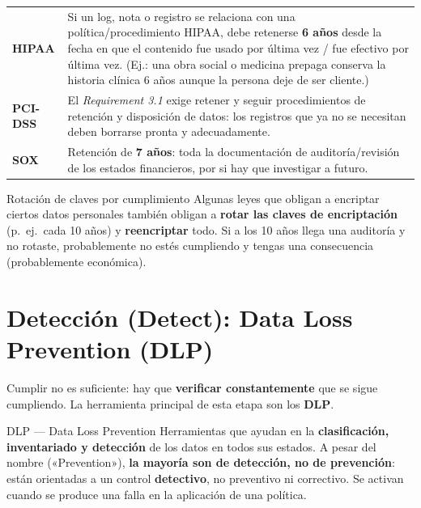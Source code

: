 \documentclass[11pt,a4paper]{article}
\begin{document}
\begin{center}
\renewcommand{\arraystretch}{1.3}
\begin{tabular}{>{\bfseries}p{2.6cm} p{11.6cm}}
\toprule
HIPAA & Si un log, nota o registro se relaciona con una política/procedimiento HIPAA, debe
retenerse \textbf{6 años} desde la fecha en que el contenido fue usado por última vez / fue
efectivo por última vez. (Ej.: una obra social o medicina prepaga conserva la historia clínica
6 años aunque la persona deje de ser cliente.) \\
PCI-DSS & El \emph{Requirement 3.1} exige retener y seguir procedimientos de retención y
disposición de datos: los registros que ya no se necesitan deben borrarse pronta y
adecuadamente. \\
SOX & Retención de \textbf{7 años}: toda la documentación de auditoría/revisión de los estados
financieros, por si hay que investigar a futuro. \\
\bottomrule
\end{tabular}
\end{center}

\begin{notebox}{Rotación de claves por cumplimiento}
Algunas leyes que obligan a encriptar ciertos datos personales también obligan a
\textbf{rotar las claves de encriptación} (p.\ ej.\ cada 10 años) y \textbf{reencriptar} todo.
Si a los 10 años llega una auditoría y no rotaste, probablemente no estés cumpliendo y tengas
una consecuencia (probablemente económica).
\end{notebox}

\section{Detección (Detect): Data Loss Prevention (DLP)}

Cumplir no es suficiente: hay que \textbf{verificar constantemente} que se sigue cumpliendo.
La herramienta principal de esta etapa son los \textbf{DLP}.

\begin{defbox}{DLP — Data Loss Prevention}
Herramientas que ayudan en la \textbf{clasificación, inventariado y detección} de los datos en
todos sus estados. A pesar del nombre («Prevention»), \textbf{la mayoría son de detección, no
de prevención}: están orientadas a un control \textbf{detectivo}, no preventivo ni correctivo.
Se activan cuando se produce una falla en la aplicación de una política.
\end{defbox}
\end{document}
